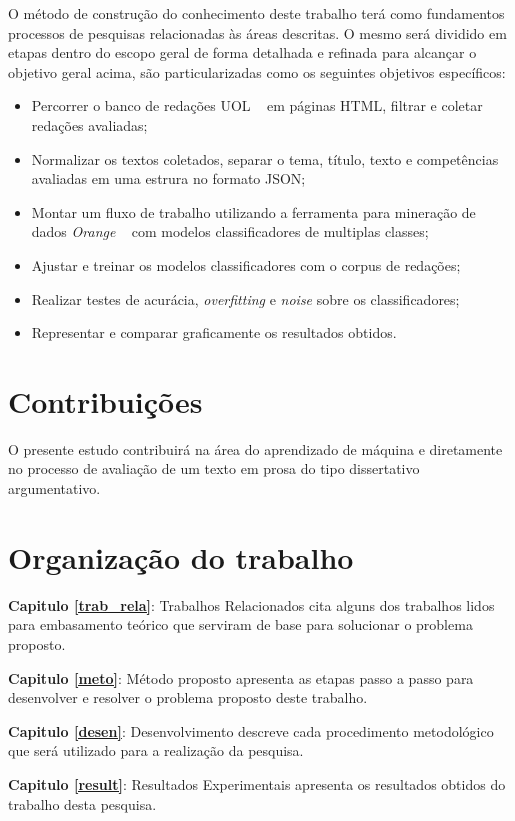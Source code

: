O método de construção do conhecimento deste trabalho terá como fundamentos processos de pesquisas relacionadas às áreas descritas. O mesmo será dividido em etapas dentro do escopo geral de forma detalhada e refinada para alcançar o objetivo geral acima, são particularizadas como os seguintes objetivos específicos:

\begin{itemize}
 \item Percorrer o banco de redações UOL ~\cite{uol_banco_redacoes:2017} em páginas HTML, filtrar e coletar redações avaliadas;
 \item Normalizar os textos coletados, separar o tema, título, texto e competências avaliadas em uma estrura no formato JSON;
 \item Montar um fluxo de trabalho utilizando a ferramenta para mineração de dados \textit{Orange} ~\cite{JMLR:demsar13a} com modelos classificadores de multiplas classes;
 \item Ajustar e treinar os modelos classificadores com o corpus de redações; 
 \item Realizar testes de acurácia, \textit{overfitting} e \textit{noise} sobre os classificadores;
 \item Representar e comparar graficamente os resultados obtidos. 
\end{itemize}

\section{Contribuições}

O presente estudo contribuirá na área do aprendizado de máquina e diretamente no processo de avaliação de um texto em prosa do tipo dissertativo argumentativo.

\section{Organização do trabalho}

\noindent \textbf{Capitulo \ref{trab_rela}}: Trabalhos Relacionados cita alguns dos trabalhos lidos para  embasamento teórico que serviram de base para solucionar o problema proposto.

\noindent \textbf{Capitulo \ref{meto}}: Método proposto apresenta as etapas passo a passo para desenvolver e resolver o problema proposto deste trabalho.

\noindent \textbf{Capitulo \ref{desen}}: Desenvolvimento descreve cada procedimento metodológico que será
utilizado para a realização da pesquisa.

\noindent \textbf{Capitulo \ref{result}}: Resultados Experimentais apresenta os resultados obtidos do trabalho desta pesquisa.
